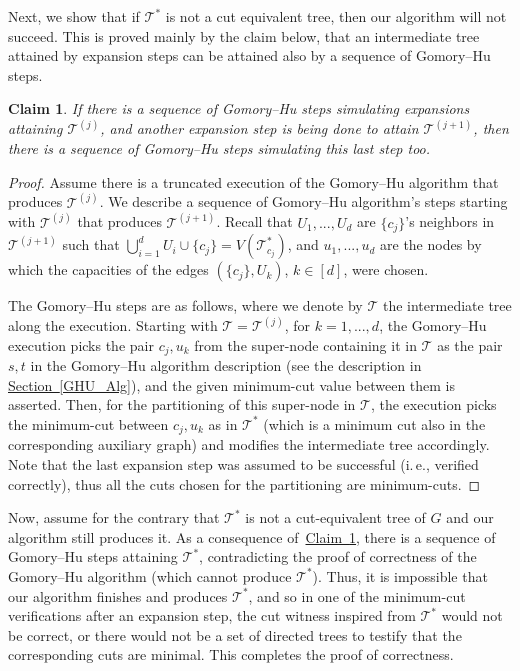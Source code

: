 \documentclass[11pt]{article}
\numberwithin{equation}{section}
\newtheorem{claim}[theorem]{Claim}
\theoremstyle{definition}
\theoremstyle{plain}
\newcommand{\ie}{i.\,e.}
\newcommand{\expref}[2]{\hyperref[#2]{#1~\ref{#2}}}
\theoremstyle{plain}
\newcommand{\T}{\mathcal{T}}
\newcommand{\TG}{\mathcal{T}^*}
\providecommand{\set}[1]{{\{#1\}}}
\begin{document}
Next, we show that if $\TG$ is not a cut equivalent tree, then our algorithm will not succeed.
This is proved mainly by the claim below,
that an intermediate tree attained by expansion steps can be attained also by a sequence of Gomory--Hu steps.

\begin{claim}\label{claim:GH}
If there is a sequence of Gomory--Hu steps simulating  expansions attaining ${\T}^{(j)}$, and another expansion step is being done to attain ${\T}^{(j+1)}$, then there is a sequence of Gomory--Hu steps simulating this last step too.
\end{claim}

\begin{proof}
Assume there is a truncated execution of the Gomory--Hu algorithm that produces ${\T}^{(j)}$. We describe a sequence of Gomory--Hu algorithm's steps starting with ${\T}^{(j)}$ that produces ${\T}^{(j+1)}$.
Recall that $U_{1},...,U_{d}$ are $\set{c_j}$'s neighbors in $\T^{(j+1)}$ such that $\bigcup_{i=1}^d U_i\cup \set{c_j} = V(\TG_{c_j})$,
and $u_{1},...,u_{d}$ are the nodes by which the capacities of the edges $(\set{c_j},U_k)$, $k\in [d]$, were chosen.

The Gomory--Hu steps are as follows, where we denote by $\T$ the intermediate tree along the execution.
Starting with $\T=\T^{(j)}$, for $k=1,...,d$, the Gomory--Hu execution picks the pair $c_j,u_{k}$ from the super-node containing it in $\T$ as the pair $s,t$ in the Gomory--Hu algorithm description (see the description in \expref{Section}{GHU_Alg}), and the given minimum-cut value between them is asserted. Then, for the partitioning of this super-node in $\T$, the execution picks the minimum-cut between $c_j,u_{k}$ as in $\TG$ (which is a minimum cut also in the corresponding auxiliary graph) and modifies the intermediate tree accordingly. Note that the last expansion step was assumed to be successful (\ie, verified correctly), thus all the cuts chosen for the partitioning are minimum-cuts.
\end{proof}

Now, assume for the contrary that $\TG$ is not a cut-equivalent tree of $G$ and our algorithm still produces it.
As a consequence of~\expref{Claim}{claim:GH}, there is a sequence of Gomory--Hu steps attaining $\TG$, contradicting the proof of correctness of the Gomory--Hu algorithm (which cannot produce $\TG$).
Thus, it is impossible that our algorithm finishes and produces $\TG$, and so in one of the minimum-cut verifications after an expansion step, the cut witness inspired from $\TG$ would not be correct, or there would not be a set of directed trees to testify that the corresponding cuts are minimal. This completes the proof of correctness.
\end{document}
